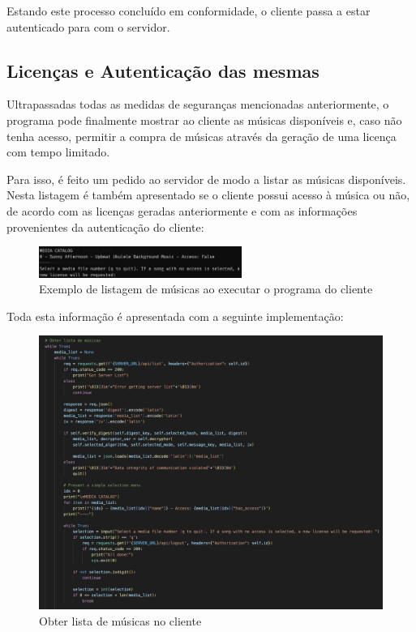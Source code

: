 \documentclass[10pt,english]{article}
\begin{document}
\par Estando este processo concluído em conformidade, o cliente passa a estar autenticado para com o servidor.

\clearpage

\subsection{Licenças e Autenticação das mesmas}

\par Ultrapassadas todas as medidas de seguranças mencionadas anteriormente, o programa pode finalmente mostrar ao cliente as músicas disponíveis e, caso não tenha acesso, permitir a compra de músicas através da geração de uma licença com tempo limitado.

\par Para isso, é feito um pedido ao servidor de modo a listar as músicas disponíveis. Nesta listagem é também apresentado se o cliente possui acesso à música ou não, de acordo com as licenças geradas anteriormente e com as informações provenientes da autenticação do cliente:

\begin{figure}[!h]
        \centering
        \includegraphics[width=250]{images/catalog_running.png}
        \caption{Exemplo de listagem de músicas ao executar o programa do cliente}
\end{figure}

\par Toda esta informação é apresentada com a seguinte implementação:

\begin{figure}[!h]
        \centering
        \includegraphics[width=450]{images/get_list_client.png}
        \caption{Obter lista de músicas no cliente}
\end{figure}
\end{document}
